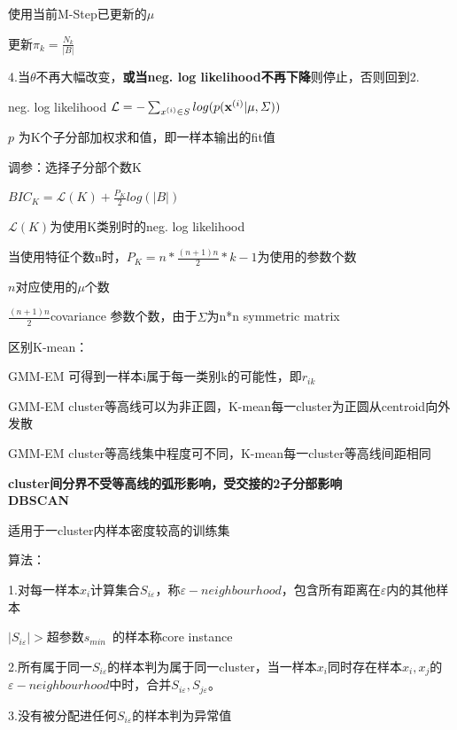 \documentclass[UTF8]{ctexart}
\begin{document}
  \quad \quad \quad 使用当前M-Step已更新的$\mu$

  \quad \quad 更新$\pi_k = \frac{N_k}{|B|}$

  \quad 4.当$\theta$不再大幅改变，\textbf{或当neg. log likelihood不再下降}则停止，否则回到2.

  \quad \quad neg. log likelihood $\mathcal{L} = -\sum_{x^{(i)} \in S} log(p({\bf x}^{(i)}|\mu, \varSigma))$

  \quad \quad \quad $p$ 为K个子分部加权求和值，即一样本输出的fit值

  调参：选择子分部个数K

  \quad $BIC_K = \mathcal{L}(K) + \frac{P_K}{2}log(|B|)$

  \quad \quad $\mathcal{L}(K)$为使用K类别时的neg. log likelihood

  \quad \quad 当使用特征个数n时，$P_K = n * \frac{(n+1)n}{2} * k - 1$为使用的参数个数

  \quad \quad \quad $n$对应使用的$\mu$个数

  \quad \quad \quad $\frac{(n+1)n}{2}$covariance 参数个数，由于$\varSigma$为n*n symmetric matrix

  区别K-mean：

  \quad GMM-EM 可得到一样本i属于每一类别k的可能性，即$r_{ik}$

  \quad GMM-EM cluster等高线可以为非正圆，K-mean每一cluster为正圆从centroid向外发散
  
  \quad GMM-EM cluster等高线集中程度可不同，K-mean每一cluster等高线间距相同
  
  \quad \quad \textbf{cluster间分界不受等高线的弧形影响，受交接的2子分部影响}\\
\textbf{DBSCAN}

  适用于一cluster内样本密度较高的训练集

  算法：

  \quad 1.对每一样本$x_i$计算集合$S_{i\varepsilon}$，称$\varepsilon -neighbourhood$，包含所有距离在$\varepsilon $内的其他样本

  \quad \quad $|S_{i\varepsilon}| > $超参数$s_{min}$\ 的样本称core instance

  \quad 2.所有属于同一$S_{i\varepsilon }$的样本判为属于同一cluster，当一样本$x_i$同时存在样本$x_i, x_j$的$\varepsilon -neighbourhood$中时，合并$S_{i\varepsilon }, S_{j\varepsilon }$。

  \quad 3.没有被分配进任何$S_{i\varepsilon }$的样本判为异常值

\end{document}
